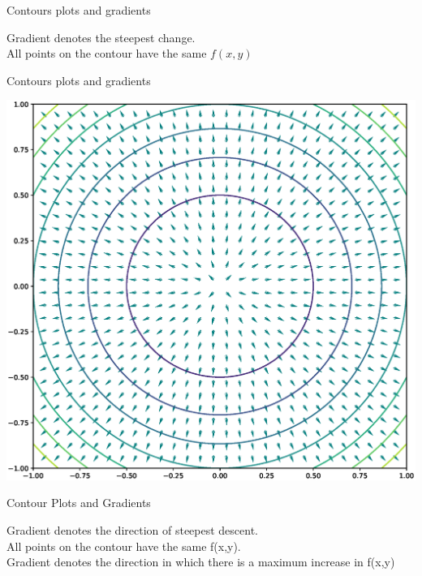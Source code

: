 \documentclass{beamer}
\begin{document}
\begin{frame}{Contours plots and gradients}
    
    
    Gradient denotes the steepest change.\\
    All points on the contour have the same $f(x,y)$\\
    
    
\end{frame}

\begin{frame}{Contours plots and gradients}
    
     \begin{center}
     \includegraphics[totalheight=6cm]{ml-maths/gradient-field.eps}
 \end{center}
    
    
\end{frame}







\begin{frame}{Contour Plots and Gradients}
    
    Gradient denotes the direction of steepest descent.\\
    All points on the contour have the same f(x,y).\\
    Gradient denotes the direction in which there is a maximum increase in f(x,y)\\

    
    
\end{frame}
\end{document}
